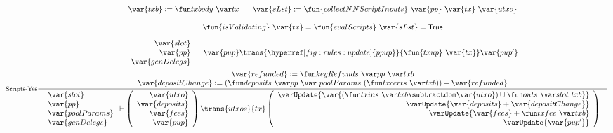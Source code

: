 \begin{figure}[htb]
  \begin{equation}
    \inference[Scripts-Yes]
    {
    \var{txb}\leteq\txbody{tx} &
    \var{sLst} := \fun{collectNNScriptInputs}~\var{pp}~\var{tx}~\var{utxo}
    \\
    ~
    \\
    \fun{isValidating}~\var{tx} = \fun{evalScripts}~\var{sLst} = \True
    \\~\\
    {
      \begin{array}{r}
        \var{slot} \\
        \var{pp} \\
        \var{genDelegs} \\
      \end{array}
    }
    \vdash \var{pup} \trans{\hyperref[fig:rules:update]{ppup}}{\fun{txup}~\var{tx}} \var{pup'}
    \\~\\
    \var{refunded} \leteq \keyRefunds{pp}{txb}
    \\
    \var{depositChange} \leteq
      (\deposits{pp}~{poolParams}~{(\txcerts{txb})}) - \var{refunded}
    }
    {
    \begin{array}{l}
      \var{slot}\\
      \var{pp}\\
      \var{poolParams}\\
      \var{genDelegs}\\
    \end{array}
      \vdash
      \left(
      \begin{array}{r}
        \var{utxo} \\
        \var{deposits} \\
        \var{fees} \\
        \var{pup} \\
      \end{array}
      \right)
      \trans{utxos}{tx}
      \left(
      \begin{array}{r}
        \varUpdate{\var{(\txins{txb} \subtractdom \var{utxo}) \cup \outs{slot}~{txb}}}  \\
        \varUpdate{\var{deposits} + \var{depositChange}} \\
        \varUpdate{\var{fees} + \txfee{txb}} \\
        \varUpdate{\var{pup'}} \\
      \end{array}
      \right) \\
}
\end{equation}
\end{figure}
